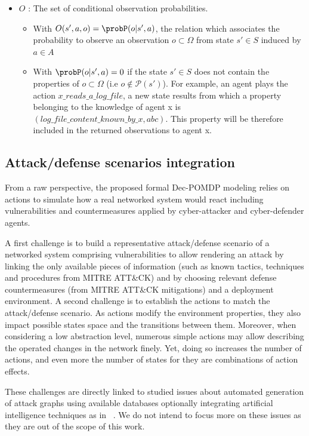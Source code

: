 \begin{itemize}
    \item $O$ : The set of conditional observation probabilities.
    \begin{itemize}
        \item With $O(s',a,o) = \probP(o|s',a)$, the relation which associates the probability to observe an observation $o \subset \Omega$ from state $s' \in S$ induced by $a \in A$
        \item With $\probP(o|s',a) = 0$ if the state $s' \in S$ does not contain the properties of $o \subset \Omega$ (i.e $o \not\in \mathcal{P}(s')$). For example, an agent plays the action $x\_reads\_a\_log\_file$, a new state results from which a property belonging to the knowledge of agent x is $(log\_file\_content\_known\_by\_x, \allowbreak abc)$. This property will be therefore included in the returned observations to agent x. 
    \end{itemize}

\end{itemize}


\subsection{Attack/defense scenarios integration\label{sec:ad_integration}}

\noindent
From a raw perspective, the proposed formal Dec-POMDP modeling relies on actions to simulate how a real networked system would react including vulnerabilities and countermeasures applied by cyber-attacker and cyber-defender agents.

A first challenge is to build a representative attack/defense scenario of a networked system comprising vulnerabilities to allow rendering an attack by linking the only available pieces of information (such as known tactics, techniques and procedures from MITRE ATT\&CK) and by choosing relevant defense countermeasures (from MITRE ATT\&CK mitigations) and a deployment environment. A second challenge is to establish the actions to match the attack/defense scenario. As actions modify the environment properties, they also impact possible states space and the transitions between them.
Moreover, when considering a low abstraction level, numerous simple actions may allow describing the operated changes in the network finely. Yet, doing so increases the number of actions, and even more the number of states for they are combinations of action effects.

These challenges are directly linked to studied issues about automated generation of attack graphs using available databases optionally integrating artificial intelligence techniques as in ~\cite{GFalco2018}. We do not intend to focus more on these issues as they are out of the scope of this work.

